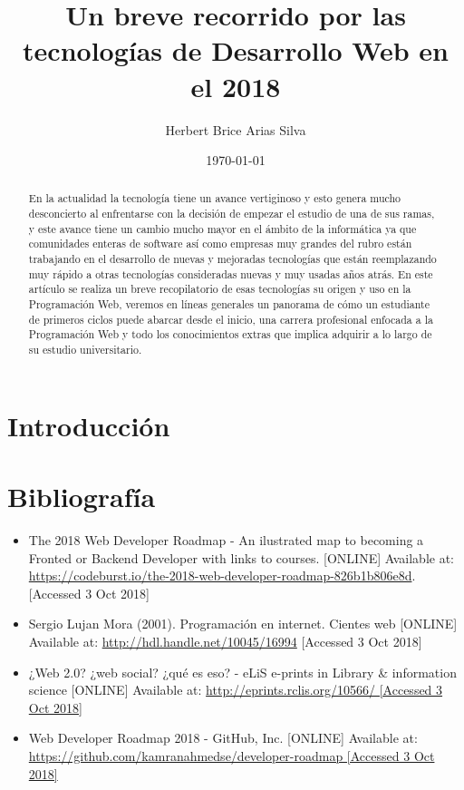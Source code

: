 \documentclass[a4paper]{article}
\title{Un breve recorrido por las tecnologías de Desarrollo Web en el 2018 }
\author{Herbert Brice Arias Silva}
\date{\today}
\begin{document}
\maketitle

\begin{abstract}
   En la actualidad la tecnología tiene un avance vertiginoso y esto genera
   mucho desconcierto al enfrentarse con la decisión de empezar el estudio de
   una de sus ramas, y este avance tiene un cambio mucho mayor en el ámbito de
   la informática ya que comunidades enteras de software así como empresas muy
   grandes del rubro están trabajando en el desarrollo de nuevas y mejoradas
   tecnologías que están reemplazando muy rápido a otras tecnologías
   consideradas nuevas y muy usadas años atrás. En este artículo se realiza un
   breve recopilatorio de esas tecnologías su origen y uso en la Programación
   Web, veremos en líneas generales un panorama de cómo un estudiante de
   primeros ciclos puede abarcar desde el inicio, una carrera profesional
   enfocada a la Programación Web y todo los conocimientos extras que implica
   adquirir a lo largo de su estudio universitario.
\end{abstract}

\section{Introducción}


\section{Bibliografía }

\begin{itemize}
   \item The 2018 Web Developer Roadmap - An ilustrated map to becoming a
      Fronted or Backend Developer with links to courses. [ONLINE] Available
      at: \url{https://codeburst.io/the-2018-web-developer-roadmap-826b1b806e8d}.
      [Accessed 3 Oct 2018]
\end{itemize}

\begin{itemize}
   \item Sergio Lujan Mora (2001). Programación en internet. Cientes web [ONLINE] Available
      at: \url{http://hdl.handle.net/10045/16994}
      [Accessed 3 Oct 2018]
\end{itemize}

\begin{itemize}
   \item ¿Web 2.0? ¿web social? ¿qué es eso? - eLiS e-prints in Library &
      information science [ONLINE] Available at:
      \url{http://eprints.rclis.org/10566/ [Accessed 3 Oct 2018]}
\end{itemize}

\begin{itemize}
   \item Web Developer Roadmap 2018 - GitHub, Inc. [ONLINE] Available at:
      \url{https://github.com/kamranahmedse/developer-roadmap [Accessed 3 Oct 2018]}

\end{itemize}
\end{document}
